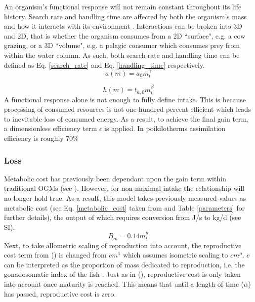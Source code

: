 \documentclass[a4paper, 11pt, hidelinks]{article} %
\begin{document}
	An organism's functional response will not remain constant throughout its life history.  Search rate and handling time are affected by both the organism's mass and how it interacts with its environment \parencite{Pawar2012}.  
	Interactions can be broken into 3D and 2D, that is whether the organism consumes from a 2D ``surface", e.g. a cow grazing, or a 3D ``volume", e.g. a pelagic consumer which consumes prey from within the water column.  As such, both search rate and handling time can be defined as Eq. \ref{search_rate} and Eq. \ref{handling_time} respectively.
	\begin{equation}
		\label{search_rate}
		a(m) = a_0 m_t^\gamma
	\end{equation}
	
	\begin{equation}
		\label{handling_time}
		h(m) = t_{h,0} m_t^\beta
	\end{equation}
	A functional response alone is not enough to fully define intake.  This is because processing of consumed resources is not one hundred percent efficient which leads to inevitable loss of consumed energy.  As a result, to achieve the final gain term, a dimensionless efficiency term $\epsilon$ is applied.  In poikilotherms assimilation efficiency is roughly 70\% \parencite{Peters1983}
	
	\subsubsection{Loss}
	Metabolic cost  has previously been dependant upon the gain term within traditional OGMs (see \cite{West2001, Hou2008}).  However, for non-maximal intake the relationship will no longer hold true.  As a result, this model takes previously measured values as metabolic cost (see Eq. \ref{metabolic_cost} taken from \cite{Peters1983} %
	and Table \ref{parameters} for further details), the output of which requires conversion from J/s to kg/d (see SI).
	\begin{equation}
		\label{metabolic_cost}
		B_m = 0.14 m_t^\mu
	\end{equation}
	Next, to take allometric scaling of reproduction into account, the reproductive cost term from \citeauthor{Charnov2001} (\citeyear{Charnov2001}) is changed from $cm^1$ which assumes isometric scaling to $cm^\rho$.  $c$ can be interpreted as the proportion of mass dedicated to reproduction, i.e. the gonadosomatic index of the fish \parencite{Charnov2001}.  Just as in \citeauthor{Charnov2001} (\citeyear{Charnov2001}), reproductive cost is only taken into account once maturity is reached.  This means that until a length of time ($\alpha$) has passed, reproductive cost is zero.
	
\end{document}
